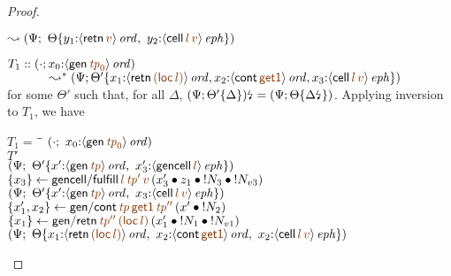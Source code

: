\begin{proof}
\begin{description}
\qquad\qquad
  $\leadsto \left(\Psi; ~
   \tackon{\Theta}
    {y_1{:}\istrue{\susp{{\sf retn}\,\lf{v}}}, ~
     y_2{:}\iseph{\susp{{\sf cell}\,\lf{l}\,\lf{v}}}
    }\right)$

   \medskip
   $T_1 :: (\cdot; x_0{:}\istrue{\susp{{\sf gen}\,\lf{{\it tp}_0}}}) $\\
    $ ~ \quad\qquad\leadsto^* \left(\Psi;
     \tackon{\Theta'}{x_1{:}\istrue{\susp{{\sf retn}\,\lf{({\sf loc}\,l)}}}, 
     x_2{:}\istrue{\susp{{\sf cont}\,\lf{{\sf get1}}}}, 
     x_3{:}\iseph{\susp{{\sf cell}\,\lf{l}\,\lf{v}}}
    }
     \right)$ \\
   for some $\Theta'$ such that, for all $\Delta$,
   ${(\Psi; {\Theta'}\{{\Delta}\})}{\mbox{\lightning}}_{} = (\Psi;
   {\Theta}\{{{\Delta}{\mbox{\lightning}}_{}}\})$. Applying 
   inversion to $T_1$, we have

   \medskip

\begin{tabbing}
$T_1 = ~$ \= \qquad \= 
    $(\cdot; ~ x_0{:}\istrue{\susp{{\sf gen}\,\lf{{\it tp}_0}}})$
\\
\>$T'$
\\
\>\> $\left(\Psi; ~
       \tackon{\Theta'}
       {x'{:}\istrue{\susp{{\sf gen}\,\lf{{\it tp}}}}, ~
        x_3'{:}\iseph{\susp{{\sf gencell}\,\lf{l}}}
       }\right)$
\\
\>$\trstep{x_3}{{\sf gencell/fulfill}\,\lf{l}\,\lf{{\it tp}'}\,\lf{v}\,
      (\tfuser{x_3'}{\tfuser{z_1}{\tfuser{\tbangr{N_3}}{\tbangr{N_{v3}}}}})}$
\\
\>\> $\left(\Psi; ~
       \tackon{\Theta'}
       {x'{:}\istrue{\susp{{\sf gen}\,\lf{{\it tp}}}}, ~
        x_3{:}\iseph{\susp{{\sf cell}\,\lf{l}\,\lf{v}}}
       }\right)$
\\
\>$\trstep{x_1',x_2}{{\sf gen/cont}\,
     \lf{{\it tp}}\,\lf{{\sf get1}}\,\lf{{\it tp}''}\,
     (\tfuser{x'}{\tbangr{N_2}})}$
\\
\>$\trstep{x_1}{{\sf gen/retn}\,\lf{{\it tp}''}\,\lf{({\sf loc}\,l)}\,
     (\tfuser{x_1'}{\tfuser{\tbangr{N_1}}{\tbangr{N_{v1}}}})}$ 
\\
\>\>$\left(\Psi; ~
   \tackon{\Theta}
    {x_1{:}\istrue{\susp{{\sf retn}\,\lf{({\sf loc}\,l)}}}, ~
     x_2{:}\istrue{\susp{{\sf cont}\,\lf{{\sf get1}}}}, ~
     x_2{:}\iseph{\susp{{\sf cell}\,\lf{l}\,\lf{v}}}
    }\right)$
\end{tabbing}


\end{description}
\end{proof}
